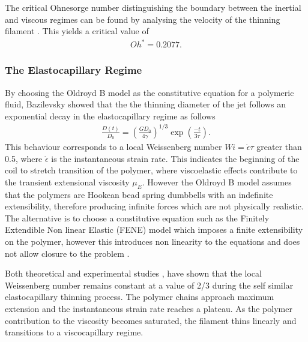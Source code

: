 \documentclass[11pt]{article}
\begin{document}
The critical Ohnesorge number distinguishing the boundary between the inertial and viscous regimes can be found by analysing the velocity of the thinning filament \cite{campo2010slow}. This yields a critical value of
\begin{align*}
Oh^* = 0.2077.
\end{align*}

\subsubsection{The Elastocapillary Regime} \label{sec:elasto}
By choosing the Oldroyd B model as the constitutive equation for a polymeric fluid, Bazilevsky \cite{bazilevsky1990liquid} showed that the the thinning diameter of the jet follows an exponential decay in the elastocapillary regime as follows
\begin{align}
\frac{D(t)}{D_0} = \left(\frac{G D_0}{4 \gamma}\right)^{1/3} \exp \left(\frac{-t}{3 \tau}\right).
\label{eqn:elasto_thinning}
\end{align}
This behaviour corresponds to a local Weissenberg number $Wi = \dot{\epsilon} \tau$ greater than 0.5, where $\dot{\epsilon}$ is the instantaneous strain rate. This indicates the beginning of the coil to stretch transition of the polymer, where viscoelastic effects contribute to the transient extensional viscosity $\mu_E$. However the Oldroyd B model assumes that the polymers are Hookean bead spring dumbbells with an indefinite extensibility, therefore producing infinite forces which are not physically realistic. The alternative is to choose a constitutive equation such as the Finitely Extendible Non linear Elastic (FENE) model which imposes a finite extensibility on the polymer, however this introduces non linearity to the equations and does not allow closure to the problem \cite{entov1997effect}.

Both theoretical and experimental studies \cite{entov1997effect}, \cite{mckinley2005visco} have shown that the local Weissenberg number remains constant at a value of 2/3 during the self similar elastocapillary thinning process. The polymer chains approach maximum extension and the instantaneous strain rate reaches a plateau. As the polymer contribution to the viscosity becomes saturated, the filament thins linearly and transitions to a viscocapillary regime.
\end{document}
